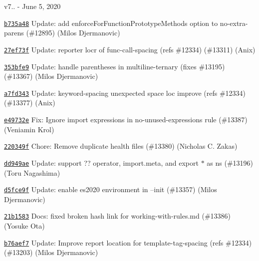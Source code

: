 v7.. -\/ June 5, 2020


\begin{DoxyItemize}
\item \href{https://github.com/eslint/eslint/commit/b735a485e77bcc791e4c4c6b8716801d94e98b2c}{\texttt{ {\ttfamily b735a48}}} Update\+: add enforce\+For\+Function\+Prototype\+Methods option to no-\/extra-\/parens (\#12895) (Milos Djermanovic)
\item \href{https://github.com/eslint/eslint/commit/27ef73ffb7428d5eff792d443186a2313e417bda}{\texttt{ {\ttfamily 27ef73f}}} Update\+: reporter locr of func-\/call-\/spacing (refs \#12334) (\#13311) (Anix)
\item \href{https://github.com/eslint/eslint/commit/353bfe9760ec640f470859855d4018df084a4e88}{\texttt{ {\ttfamily 353bfe9}}} Update\+: handle parentheses in multiline-\/ternary (fixes \#13195) (\#13367) (Milos Djermanovic)
\item \href{https://github.com/eslint/eslint/commit/a7fd343991cde99d8a219e3b25616db5792fe9a9}{\texttt{ {\ttfamily a7fd343}}} Update\+: keyword-\/spacing unexpected space loc improve (refs \#12334) (\#13377) (Anix)
\item \href{https://github.com/eslint/eslint/commit/e49732eb41bff6347ca7718c3c5ca1d13f1cd2d3}{\texttt{ {\ttfamily e49732e}}} Fix\+: Ignore import expressions in no-\/unused-\/expressions rule (\#13387) (Veniamin Krol)
\item \href{https://github.com/eslint/eslint/commit/220349f5404060effe02fb5ec176a92e1383c3b5}{\texttt{ {\ttfamily 220349f}}} Chore\+: Remove duplicate health files (\#13380) (Nicholas C. Zakas)
\item \href{https://github.com/eslint/eslint/commit/dd949aedb81fa772e10568920156daf075d25ea2}{\texttt{ {\ttfamily dd949ae}}} Update\+: support {\ttfamily ??} operator, import.\+meta, and {\ttfamily export \texorpdfstring{$\ast$}{*} as ns} (\#13196) (Toru Nagashima)
\item \href{https://github.com/eslint/eslint/commit/d5fce9fa07e37ce61010a1fbb65964f1f7aefd82}{\texttt{ {\ttfamily d5fce9f}}} Update\+: enable es2020 environment in --init (\#13357) (Milos Djermanovic)
\item \href{https://github.com/eslint/eslint/commit/21b15832e326f96d349c063cd7e85e72c3abb670}{\texttt{ {\ttfamily 21b1583}}} Docs\+: fixed broken hash link for working-\/with-\/rules.\+md (\#13386) (Yosuke Ota)
\item \href{https://github.com/eslint/eslint/commit/b76aef778befb32afe7ad249934b132dc49713d2}{\texttt{ {\ttfamily b76aef7}}} Update\+: Improve report location for template-\/tag-\/spacing (refs \#12334) (\#13203) (Milos Djermanovic)

\end{DoxyItemize}

